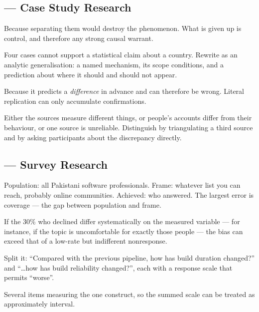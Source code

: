 \subsection*{ --- Case Study Research}
\begin{tightnum}
  \item Because separating them would destroy the phenomenon. What is given up
    is control, and therefore any strong causal warrant.
  \item Four cases cannot support a statistical claim about a country. Rewrite
    as an analytic generalisation: a named mechanism, its scope conditions, and
    a prediction about where it should and should not appear.
  \item Because it predicts a \emph{difference} in advance and can therefore be
    wrong. Literal replication can only accumulate confirmations.
  \item Either the sources measure different things, or people's accounts
    differ from their behaviour, or one source is unreliable. Distinguish by
    triangulating a third source and by asking participants about the
    discrepancy directly.
\end{tightnum}

\subsection*{ --- Survey Research}
\begin{tightnum}
  \item Population: all Pakistani software professionals. Frame: whatever list
    you can reach, probably online communities. Achieved: who answered. The
    largest error is coverage --- the gap between population and frame.
  \item If the 30\% who declined differ systematically on the measured variable
    --- for instance, if the topic is uncomfortable for exactly those people
    --- the bias can exceed that of a low-rate but indifferent nonresponse.
  \item Split it: ``Compared with the previous pipeline, how has build duration
    changed?'' and ``\ldots how has build reliability changed?'', each with a
    response scale that permits ``worse''.
  \item Several items measuring the one construct, so the summed scale can be
    treated as approximately interval.
\end{tightnum}


